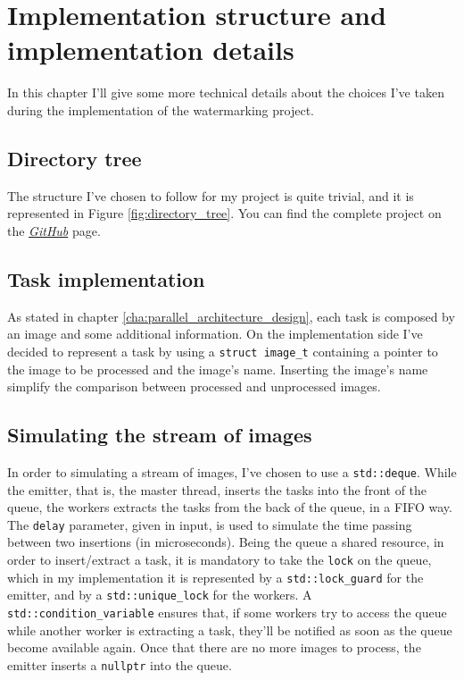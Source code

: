 \chapter{Implementation structure and implementation details} %
\label{cha:implementation_structure_and_implementation_details}
    In this chapter I'll give some more technical details about the choices I've taken during the implementation
    of the watermarking project.
    \section{Directory tree} %
    \label{sec:directory_tree}
        The structure I've chosen to follow for my project is quite trivial, and it is represented in Figure
        \ref{fig:directory_tree}. You can find the complete project on the
        \href{https://github.com/germz01/PDS_project}{\textit{GitHub}} page.
    \section{Task implementation} %
    \label{sec:task_implementation}
        As stated in chapter \ref{cha:parallel_architecture_design}, each task is composed by an image and some
        additional information. On the implementation side I've decided to represent a task by using a
        \texttt{struct image\_t} containing a pointer to the image to be processed and the image's name.
        Inserting the image's name simplify the comparison between processed and unprocessed images.
    \section{Simulating the stream of images} %
    \label{sec:simulating_the_stream_of_images}
        In order to simulating a stream of images, I've chosen to use a \texttt{std::deque}. While the emitter,
        that is, the master thread, inserts the tasks into the front of the queue, the workers extracts the tasks
        from the back of the queue, in a FIFO way. The \texttt{delay} parameter, given in input, is used to
        simulate the time passing between two insertions (in microseconds). Being the queue a shared resource,
        in order to insert/extract a task, it is mandatory to take the \texttt{lock} on the queue, which in my
        implementation it is represented by a \texttt{std::lock\_guard} for the emitter, and by a
        \texttt{std::unique\_lock} for the workers. A \texttt{std::condition\_variable} ensures that, if some
        workers try to access the queue while another worker is extracting a task, they'll be notified as soon as
        the queue become available again. Once that there are no more images to process, the emitter inserts a
        \texttt{nullptr} into the queue.
